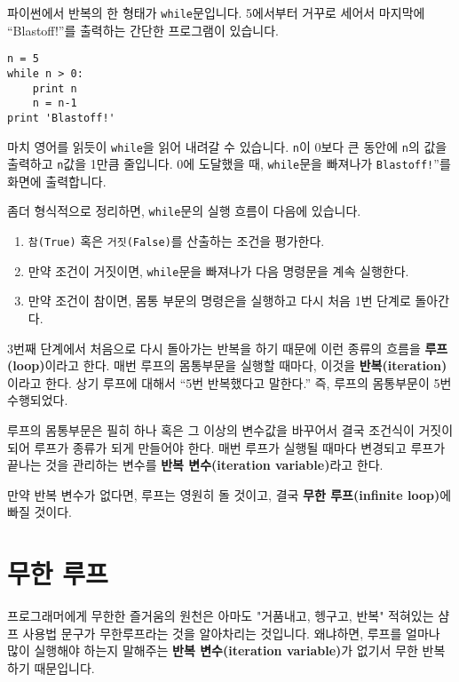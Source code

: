 파이썬에서 반복의 한 형태가 {\tt while}문입니다. 5에서부터 거꾸로 세어서 마지막에 ``Blastoff!''를 출력하는 간단한 프로그램이 있습니다.

\beforeverb
\begin{verbatim}
n = 5
while n > 0:
    print n
    n = n-1
print 'Blastoff!'
\end{verbatim}
\afterverb
%

마치 영어를 읽듯이 {\tt while}을 읽어 내려갈 수 있습니다. 
{\tt n}이 0보다 큰 동안에 {\tt n}의 값을 출력하고 {\tt n}값을 1만큼 줄입니다. 0에 도달했을 때,
{\tt while}문을 빠져나가 {\tt Blastoff!}''를 화면에 출력합니다.


좀더 형식적으로 정리하면, {\tt while}문의 실행 흐름이 다음에 있습니다.

\begin{enumerate}

\item {\tt 참(True)} 혹은 {\tt 거짓(False)}를 산출하는 조건을 평가한다.

\item 만약 조건이 거짓이면, {\tt while}문을 빠져나가 다음 명령문을 계속 실행한다.

\item 만약 조건이 참이면, 몸통 부문의 명령은을 실행하고 다시 처음 1번 단계로 돌아간다.

\end{enumerate}

3번째 단계에서 처음으로 다시 돌아가는 반복을 하기 때문에 이런 종류의 흐름을 {\bf 루프(loop)}이라고 한다.
매번 루프의 몸통부문을 실행할 때마다, 이것을 {\bf 반복(iteration)}이라고 한다. 상기 루프에 대해서 ``5번 반복했다고 말한다.'' 
즉, 루프의 몸통부문이 5번 수행되었다.


루프의 몸통부문은 필히 하나 혹은 그 이상의 변수값을 바꾸어서 결국 조건식이 거짓이 되어 루프가 종류가 되게 만들어야 한다.
매번 루프가 실행될 때마다 변경되고 루프가 끝나는 것을 관리하는 변수를 {\bf 반복 변수(iteration variable)}라고 한다.

만약 반복 변수가 없다면, 루프는 영원히 돌 것이고, 결국 {\bf 무한 루프(infinite loop)}에 빠질 것이다.

\section{무한 루프}

프로그래머에게 무한한 즐거움의 원천은 아마도 "거품내고, 헹구고, 반복" 적혀있는 샴프 사용법 문구가 무한루프라는 것을 알아차리는 것입니다.
왜냐하면, 루프를 얼마나 많이 실행해야 하는지 말해주는 {\bf 반복 변수(iteration variable)}가 없기서 무한 반복하기 때문입니다.

